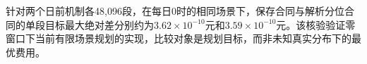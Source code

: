 针对两个日前机制各48,096段，在每日0时的相同场景下，保存合同与解析分位合同的单段目标最大绝对差分别约为$3.62\times10^{-10}$元和$3.59\times10^{-10}$元。该核验验证零窗口下当前有限场景规划的实现，比较对象是规划目标，而非未知真实分布下的最优费用。

